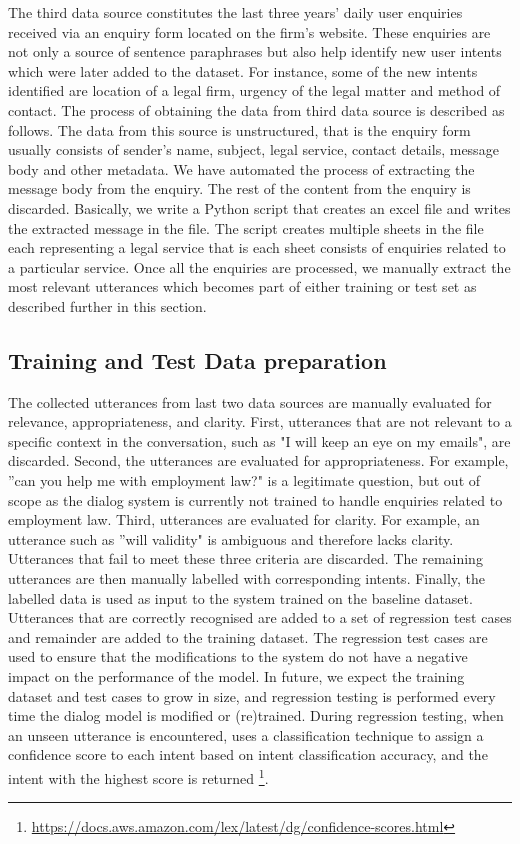 \documentclass[runningheads]{llncs}
\begin{document}
The third data source constitutes the last three years' daily user enquiries received via an enquiry form located on the firm's website. These enquiries are not only a source of sentence paraphrases but also help identify new user intents which were later added to the dataset. For instance, some of the new intents identified are location of a legal firm, urgency of the legal matter and method of contact. The process of obtaining the data from third data source is described as follows. The data from this source is unstructured, that is the enquiry form usually consists of sender's name, subject, legal service, contact details, message body and other metadata. We have automated the process of extracting the message body from the enquiry. The rest of the content from the enquiry is discarded. Basically, we write a Python script that creates an excel file and writes the extracted message in the file. The script creates multiple sheets in the file each representing a legal service that is each sheet consists of enquiries related to a particular service.
Once all the enquiries are processed, we manually extract the most relevant utterances which becomes part of either training or test set as described further in this section. 

\subsection{Training and Test Data preparation}
The collected utterances from last two data sources are manually evaluated for relevance, appropriateness, and clarity. First, utterances that are not relevant to a specific context in the conversation, such as "I will keep an eye on my emails", are discarded. Second, the utterances are evaluated for appropriateness. For example, ''can you help me with employment law?" is a legitimate question, but out of scope as the dialog system is currently not trained to handle  enquiries related to employment law. Third, utterances are evaluated for clarity. For example, an utterance such as ''will validity" is ambiguous and therefore lacks clarity. Utterances that fail to meet these three criteria are discarded. The remaining utterances are then manually labelled with corresponding intents.
Finally, the labelled data is used as input to the system trained on the baseline dataset. Utterances that are correctly recognised are added to a set of regression test cases and remainder are added to the training dataset.
The regression test cases are used to ensure that the modifications to the system do not have a negative impact on the performance of the model. In future, we expect the training dataset and test cases to grow in size, and regression testing is performed every time the dialog model is modified or (re)trained. During regression testing, when an unseen utterance is encountered, \lex uses a classification technique to assign a confidence score to each intent based on intent classification accuracy, and the intent with the highest score is returned \footnote{\url{https://docs.aws.amazon.com/lex/latest/dg/confidence-scores.html}}.
\end{document}
